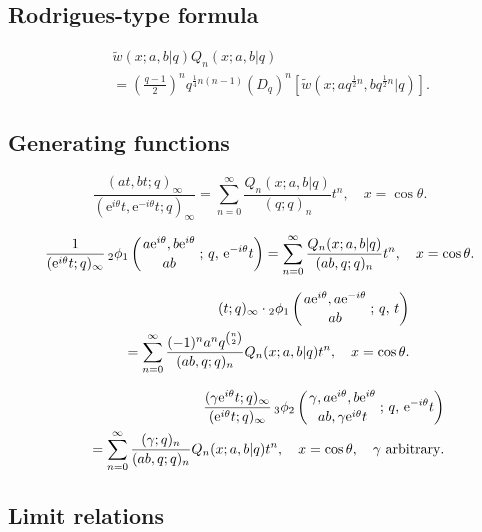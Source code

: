 \documentclass[envcountchap,graybox]{svmono}
\newcommand{\qhyp}[5]{\mbox{}_{#1}{\phi}_{#2}
\left(\genfrac{}{}{0pt}{}{#3}{#4}\,;\,q,\,#5\right)}
\newcommand{\e}{\textrm{e}}
\begin{document}
\subsection*{Rodrigues-type formula}
\begin{eqnarray}
\label{RodAlSalamChihara}
& &{\tilde w}(x;a,b|q)Q_n(x;a,b|q)\nonumber\\
& &{}=\left(\frac{q-1}{2}\right)^nq^{\frac{1}{4}n(n-1)}
\left(D_q\right)^n\left[{\tilde w}(x;aq^{\frac{1}{2}n},bq^{\frac{1}{2}n}|q)\right].
\end{eqnarray}

\subsection*{Generating functions}
\begin{equation}
\label{GenAlSalamChihara1}
\frac{(at,bt;q)_{\infty}}{(\e^{i\theta}t,\e^{-i\theta}t;q)_{\infty}}
=\sum_{n=0}^{\infty}\frac{Q_n(x;a,b|q)}{(q;q)_n}t^n,\quad x=\cos\theta.
\end{equation}

\begin{equation}
\label{GenAlSalamChihara2}
\frac{1}{(\e^{i\theta}t;q)_{\infty}}\,
\qhyp{2}{1}{a\e^{i\theta},b\e^{i\theta}}{ab}{\e^{-i\theta}t}
=\sum_{n=0}^{\infty}\frac{Q_n(x;a,b|q)}{(ab,q;q)_n}t^n,\quad x=\cos\theta.
\end{equation}

\begin{eqnarray}
\label{GenAlSalamChihara3}
& &(t;q)_{\infty}\cdot\qhyp{2}{1}{a\e^{i\theta},a\e^{-i\theta}}{ab}{t}\nonumber\\
& &{}=\sum_{n=0}^{\infty}\frac{(-1)^na^nq^{\binom{n}{2}}}{(ab,q;q)_n}Q_n(x;a,b|q)t^n,
\quad x=\cos\theta.
\end{eqnarray}

\begin{eqnarray}
\label{GenAlSalamChihara4}
& &\frac{(\gamma \e^{i\theta}t;q)_{\infty}}{(\e^{i\theta}t;q)_{\infty}}\,
\qhyp{3}{2}{\gamma,a\e^{i\theta},b\e^{i\theta}}{ab,\gamma \e^{i\theta}t}{\e^{-i\theta}t}\nonumber\\
& &{}=\sum_{n=0}^{\infty}\frac{(\gamma;q)_n}{(ab,q;q)_n}Q_n(x;a,b|q)t^n,
\quad x=\cos\theta,\quad\textrm{$\gamma$ arbitrary}.
\end{eqnarray}

\subsection*{Limit relations}
\end{document}
